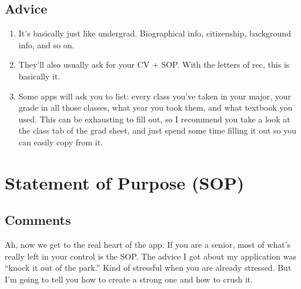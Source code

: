 \documentclass[12pt]{article}
\begin{document}
\subsection{Advice}
\begin{enumerate}
\item It’s basically just like undergrad. Biographical info, citizenship, background info, and so on.

\item They’ll also usually ask for your CV + SOP. With the letters of rec, this is basically it.

\item Some apps will ask you to list: every class you’ve taken in your major, your grade in all those classes, what year you took them, and what textbook you used. This can be exhausting to fill out, so I recommend you take a look at the class tab of the grad sheet, and just spend some time filling it out so you can easily copy from it.

\end{enumerate}

\section{Statement of Purpose (SOP)}

\subsection{Comments}
Ah, now we get to the real heart of the app. If you are a senior, most of what's really left in your control is the SOP. The advice I got about my application was ``knock it out of the park.'' Kind of stressful when you are already stressed. But I'm going to tell you how to create a strong one and how to crush it.
\end{document}
